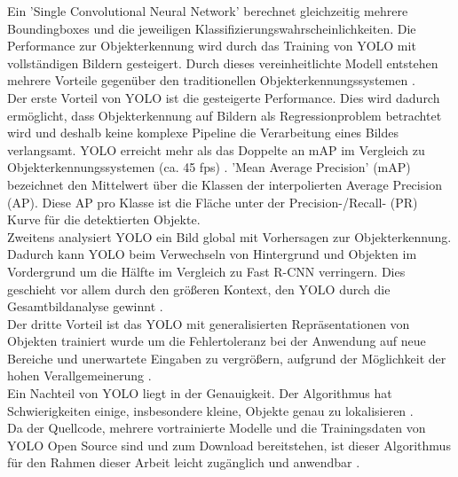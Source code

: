 {{	Ein 'Single Convolutional Neural Network' berechnet gleichzeitig mehrere Boundingboxes und die jeweiligen Klassifizierungswahrscheinlichkeiten. Die Performance zur Objekterkennung wird durch das Training von YOLO mit vollständigen Bildern gesteigert. Durch dieses vereinheitlichte Modell entstehen mehrere Vorteile gegenüber den traditionellen Objekterkennungssystemen \citep{Plastiras2018}. \\
	Der erste Vorteil von YOLO ist die gesteigerte Performance. Dies wird dadurch ermöglicht, dass Objekterkennung auf Bildern als Regressionproblem betrachtet wird und deshalb keine komplexe Pipeline die Verarbeitung eines Bildes verlangsamt. YOLO erreicht mehr als das Doppelte an mAP  im Vergleich zu Objekterkennungssystemen (ca. 45 fps) \citep{Plastiras2018}. 'Mean Average Precision' (mAP) bezeichnet den Mittelwert über die Klassen der interpolierten Average Precision (AP). Diese AP pro Klasse ist die Fläche unter der Precision-/Recall- (PR) Kurve für die detektierten Objekte. \\
	Zweitens analysiert YOLO ein Bild global mit Vorhersagen zur Objekterkennung. Dadurch kann YOLO beim Verwechseln von Hintergrund und Objekten im Vordergrund um die Hälfte im Vergleich zu Fast R-CNN verringern. Dies geschieht vor allem durch den größeren Kontext, den YOLO durch die Gesamtbildanalyse gewinnt \citep{Plastiras2018}. \\
	Der dritte Vorteil ist das YOLO mit generalisierten Repräsentationen von Objekten trainiert wurde um die Fehlertoleranz bei der Anwendung auf neue Bereiche und unerwartete Eingaben zu vergrößern, aufgrund der Möglichkeit der hohen Verallgemeinerung \citep{Plastiras2018}. \\
	Ein Nachteil von YOLO liegt in der Genauigkeit. Der Algorithmus hat Schwierigkeiten einige, insbesondere kleine, Objekte genau zu lokalisieren \citep{Plastiras2018}. \\
	Da der Quellcode, mehrere vortrainierte Modelle und die Trainingsdaten von YOLO Open Source sind und zum Download bereitstehen, ist dieser Algorithmus für den Rahmen dieser Arbeit leicht zugänglich und anwendbar \citep{Plastiras2018}. \\

}}
